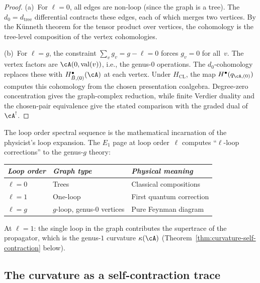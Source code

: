 \begin{proof}
(a)~For $\ell = 0$, all edges are non-loop (since the graph is a
tree). The $d_0 = d_{\mathrm{tree}}$ differential contracts these
edges, each of which merges two vertices. By the K\"unneth theorem
for the tensor product over vertices, the cohomology is the
tree-level composition of the vertex cohomologies.

(b)~For $\ell = g$, the constraint $\sum_v g_v = g - \ell = 0$
forces $g_v = 0$ for all~$v$. The vertex factors are
$\cA(0, \mathrm{val}(v))$, i.e., the genus-$0$ operations.
The $d_0$-cohomology replaces these with
$H^\bullet_{\bar B,(0)}(\cA)$ at each vertex.  Under
$H_{\mathrm{CL}}$, the map $H^\bullet(q_{\cA,(0)})$ computes this
cohomology from the chosen presentation coalgebra.  Degree-zero
concentration gives the graph-complex reduction, while finite Verdier
duality and the chosen-pair equivalence give the stated comparison
with the graded dual of~$\cA^!$.
\end{proof}

\begin{remark}%
\label{rem:loop-order-perturbative}
The loop order spectral sequence is the mathematical incarnation
of the physicist's loop expansion. The $E_1$ page at loop
order~$\ell$ computes ``$\ell$-loop corrections'' to the
genus-$g$ theory:
\begin{center}
\small
\renewcommand{\arraystretch}{1.2}
\begin{tabular}{lll}
\toprule
\emph{Loop order} & \emph{Graph type}
 & \emph{Physical meaning} \\
\midrule
$\ell = 0$ & Trees & Classical compositions \\
$\ell = 1$ & One-loop & First quantum correction \\
$\ell = g$ & $g$-loop, genus-$0$ vertices
 & Pure Feynman diagram \\
\bottomrule
\end{tabular}
\end{center}
At $\ell = 1$: the single loop in the graph contributes the
supertrace of the propagator, which is the genus-$1$ curvature
$\kappa(\cA)$ (Theorem~\ref{thm:curvature-self-contraction} below).
\end{remark}

\subsection{The curvature as a self-contraction trace}
\label{subsec:curvature-self-contraction}

